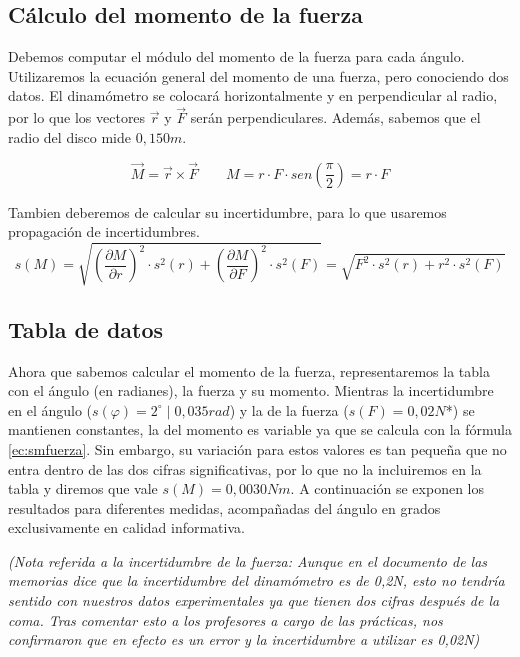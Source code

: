 \documentclass[12pt, a4paper, titlepage]{article}
\begin{document}
  \subsection{Cálculo del momento de la fuerza}

  Debemos computar el módulo del momento de la fuerza para cada ángulo. Utilizaremos la ecuación general del momento de una fuerza, pero conociendo dos datos. El dinamómetro se colocará horizontalmente y en perpendicular al radio, por lo que los vectores $\vec{r}$ y $\vec{F}$ serán perpendiculares. Además, sabemos que el radio del disco mide $0,150m$.

  \begin{equation}
    \vec{M} = \vec{r} \times \vec{F} \qquad M = r \cdot F \cdot sen\left(\frac{\pi}{2}\right) = r \cdot F \label{ec:mfuerza}
  \end{equation}

  Tambien deberemos de calcular su incertidumbre, para lo que usaremos propagación de incertidumbres.
  \begin{equation}
    s(M) = \sqrt{\left(\frac{\partial M}{\partial r}\right)^2 \cdot s^2(r) + \left(\frac{\partial M}{\partial F}\right)^2 \cdot s^2(F)} = \sqrt{F^2 \cdot s^2(r) + r^2 \cdot s^2(F)} \label{ec:smfuerza}
  \end{equation}

  \subsection{Tabla de datos}

  Ahora que sabemos calcular el momento de la fuerza, representaremos la tabla con el ángulo (en radianes), la fuerza y su momento. Mientras la incertidumbre en el ángulo ($s(\varphi) = 2^{\circ} \; | \; 0,035 rad$) y la de la fuerza ($s(F) = 0,02N$*) se mantienen constantes, la del momento es variable ya que se calcula con la fórmula \ref{ec:smfuerza}. Sin embargo, su variación para estos valores es tan pequeña que no entra dentro de las dos cifras significativas, por lo que no la incluiremos en la tabla y diremos que vale $s(M) = 0,0030 Nm$. A continuación se exponen los resultados para diferentes medidas, acompañadas del ángulo en grados exclusivamente en calidad informativa.

  \textit{(Nota referida a la incertidumbre de la fuerza: Aunque en el documento de las memorias dice que la incertidumbre del dinamómetro es de 0,2N, esto no tendría sentido con nuestros datos experimentales ya que tienen dos cifras después de la coma. Tras comentar esto a los profesores a cargo de las prácticas, nos confirmaron que en efecto es un error y la incertidumbre a utilizar es 0,02N)}
\end{document}
